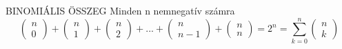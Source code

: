 \begin{tetel}{BINOMIÁLIS ÖSSZEG}
Minden n nemnegatív számra
$$\begin{pmatrix}
n\\0
\end{pmatrix} + \begin{pmatrix}
n\\1
\end{pmatrix} + \begin{pmatrix}
n\\2
\end{pmatrix} + ... + \begin{pmatrix}
n\\n-1
\end{pmatrix} + \begin{pmatrix}
n\\n
\end{pmatrix} = 2^n = \sum_{k = 0}^{n}\begin{pmatrix}
n\\k
\end{pmatrix}$$
\end{tetel}
